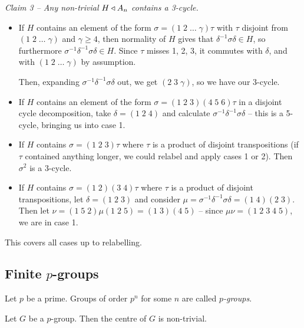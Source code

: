 \documentclass{../template/note}
\begin{document}

    \emph{Claim 3 -- Any non-trivial $H \triangleleft A_n$ contains a 3-cycle.}

    \begin{itemize}
        \item If $H$ contains an element of the form $\sigma = (1 \; 2 \; \dots \; \gamma)\tau$ with $\tau$ disjoint from $(1 \; 2 \; \dots \; \gamma)$ and $\gamma \geq 4$, then normality of $H$ gives that $\delta^{-1}\sigma\delta \in H$, so furthermore $\sigma^{-1}\delta^{-1}\sigma\delta \in H$. Since $\tau$ misses 1, 2, 3, it commutes with $\delta$, and with $(1 \; 2 \; \dots \; \gamma)$ by assumption.

        Then, expanding $\sigma^{-1}\delta^{-1}\sigma\delta$ out, we get $(2 \; 3 \; \gamma)$, so we have our 3-cycle.

        \item If $H$ contains an element of the form $\sigma = (1 \; 2 \; 3)(4 \; 5 \; 6)\tau$ in a disjoint cycle decomposition, take $\delta = (1 \; 2 \; 4)$ and calculate $\sigma^{-1}\delta^{-1}\sigma\delta$ -- this is a 5-cycle, bringing us into case 1.
        
        \item If $H$ contains $\sigma = (1 \; 2 \; 3)\tau$ where $\tau$ is a product of disjoint transpositions (if $\tau$ contained anything longer, we could relabel and apply cases 1 or 2). Then $\sigma^2$ is a 3-cycle.
        
        \item If $H$ contains $\sigma = (1 \; 2)(3 \; 4)\tau$ where $\tau$ is a product of disjoint transpositions, let $\delta = (1 \; 2 \; 3)$ and consider $\mu = \sigma^{-1}\delta^{-1}\sigma\delta = (1 \; 4)(2 \; 3)$. Then let $\nu = (1 \; 5 \; 2)\mu (1 \; 2 \; 5) = (1 \; 3)(4 \; 5)$ -- since $\mu\nu = (1 \; 2 \; 3 \; 4 \; 5)$, we are in case 1.
    \end{itemize}
    This covers all cases up to relabelling.
    
    \subsection{Finite $p$-groups}

    Let $p$ be a prime. Groups of order $p^n$ for some $n$ are called \emph{$p$-groups}.

    \begin{theorem}
        Let $G$ be a $p$-group. Then the centre of $G$ is non-trivial.
        \label{centre-nontrivial}
    \end{theorem}
    
\end{document}
